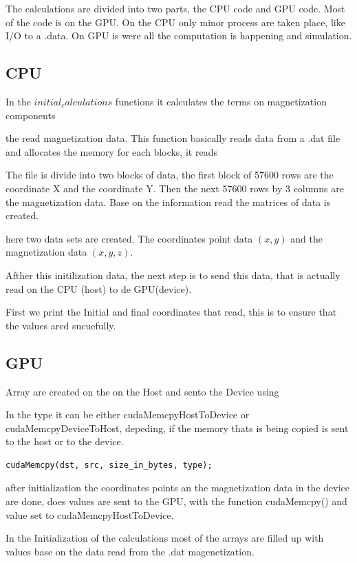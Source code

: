 The calculations are divided into two parts, the CPU code and GPU code. Most of the code is on the GPU. On the CPU only minor  process are taken place, like I/O to a .data.
On GPU is were all the computation is happening and simulation.

\subsection{CPU}
In the $initial_calculations$ functions it calculates the terms on magnetization components


the read magnetization data.
This function basically reads data from a .dat file and allocates the memory for each blocks, it reads

The file is divide into two blocks of data, the first block of 57600 rows are the coordinate X and the coordinate Y. Then the next 57600 rows by 3 columns are the magnetization data. Base on the information read the matrices of data is created.

here two data sets are created. The coordinates point data $(x,y)$ and the magnetization data $(x, y, z)$.

Afther this initilization data, the next step is to send this data, that is actually read on the CPU (host) to de GPU(device). 


First we print the Initial and final coordinates that read, this is to ensure that the values ared sucuefully.


\subsection{GPU}


Array are created on the on the Host and sento the Device using

In the type it can be either cudaMemcpyHostToDevice or cudaMemcpyDeviceToHost, depeding, if the memory thats is being copied is sent to the host or to the device.

\begin{lstlisting}[frame=none]
cudaMemcpy(dst, src, size_in_bytes, type);
\end{lstlisting}

after initialization the coordinates points an the magnetization data in the device are done, does values are sent to the GPU, with the function cudaMemcpy() and value set to cudaMemcpyHostToDevice.

In the Initialization of the calculations most of the arrays are filled up with values base on the data read from the .dat magenetization.

